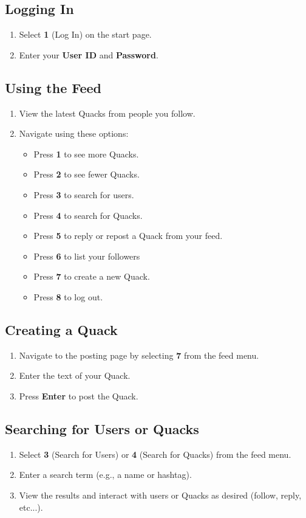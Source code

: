 \documentclass[11pt]{article}
\begin{document}
\subsection*{Logging In} \begin{enumerate} \item Select \textbf{1} (Log In) on
the start page. \item Enter your \textbf{User ID} and \textbf{Password}.
\end{enumerate}

\subsection*{Using the Feed} \begin{enumerate} \item View the latest Quacks
from people you follow. \item Navigate using these options: \begin{itemize}
\item Press \textbf{1} to see more Quacks. \item Press \textbf{2} to see fewer
Quacks. \item Press \textbf{3} to search for users. \item Press \textbf{4} to
search for Quacks. \item Press \textbf{5} to reply or repost a Quack from your
feed. \item Press \textbf{6} to list your followers \item Press \textbf{7} to
create a new Quack. \item Press \textbf{8} to log out. \end{itemize}
\end{enumerate}

\subsection*{Creating a Quack} \begin{enumerate} \item Navigate to the posting
page by selecting \textbf{7} from the feed menu. \item Enter the text of your
Quack. \item Press \textbf{Enter} to post the Quack. \end{enumerate}

\subsection*{Searching for Users or Quacks} \begin{enumerate} \item Select
\textbf{3} (Search for Users) or \textbf{4} (Search for Quacks) from the feed
menu. \item Enter a search term (e.g., a name or hashtag). \item View the
results and interact with users or Quacks as desired (follow, reply, etc...).
\end{enumerate}
\end{document}
